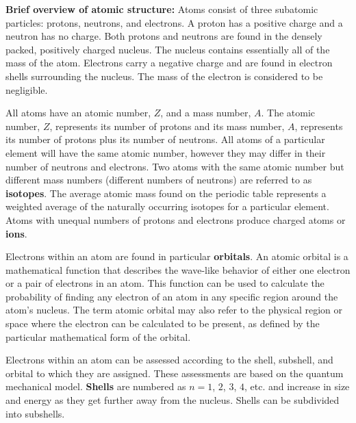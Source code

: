 \documentclass[a4paper,10pt]{article}
\begin{document}
{\noindent}\textbf{Brief overview of atomic structure:} Atoms consist of three subatomic particles: protons, neutrons, and electrons. A proton has a positive charge and a neutron has no charge. Both protons and neutrons are found in the densely packed, positively charged nucleus. The nucleus contains essentially all of the mass of the atom. Electrons carry a negative charge and are found in electron shells surrounding the nucleus. The mass of the electron is considered to be negligible.

{\noindent}All atoms have an atomic number, $Z$, and a mass number, $A$. The atomic number, $Z$, represents its number of protons and its mass number, $A$, represents its number of protons plus its number of neutrons. All atoms of a particular element will have the same atomic number, however they may differ in their number of neutrons and electrons. Two atoms with the same atomic number but different mass numbers (different numbers of neutrons) are referred to as \textbf{isotopes}. The average atomic mass found on the periodic table represents a weighted average of the naturally occurring isotopes for a particular element. Atoms with unequal numbers of protons and electrons produce charged atoms or \textbf{ions}.

{\noindent}Electrons within an atom are found in particular \textbf{orbitals}. An atomic orbital is a mathematical function that describes the wave-like behavior of either one electron or a pair of electrons in an atom. This function can be used to calculate the probability of finding any electron of an atom in any specific region around the atom's nucleus. The term atomic orbital may also refer to the physical region or space where the electron can be calculated to be present, as defined by the particular mathematical form of the orbital. 

{\noindent}Electrons within an atom can be assessed according to the shell, subshell, and orbital to which they are assigned. These assessments are based on the quantum mechanical model. \textbf{Shells} are numbered as $n=1$, $2$, $3$, $4$, etc. and increase in size and energy as they get further away from the nucleus. Shells can be subdivided into subshells.
\end{document}
